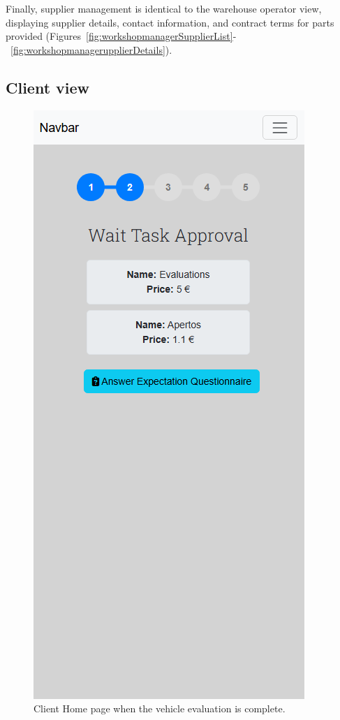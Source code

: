 Finally, supplier management is identical to the warehouse operator view, displaying supplier details, contact information, and contract terms for parts provided (Figures~\ref{fig:workshopmanagerSupplierList}-~\ref{fig:workshopmanagerupplierDetails}).



\subsection{Client view}

\begin{figure}[h]
  \caption{Client Home page when the vehicle evaluation is complete.}
  \centering
  \includegraphics[width=\textwidth]{figs/Implementation/client/MaintenanceState2}

\end{figure}
